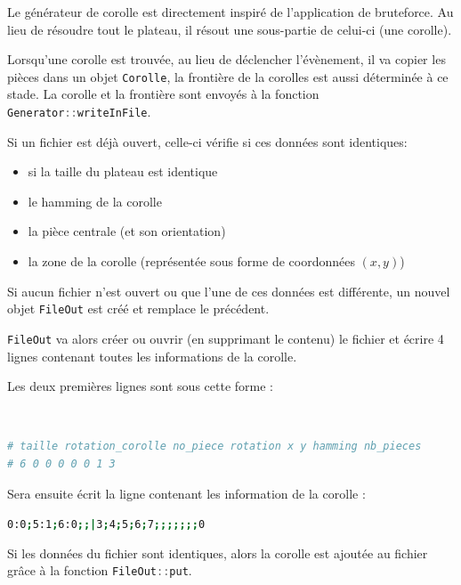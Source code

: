 Le générateur de corolle est directement inspiré de l'application de bruteforce. Au lieu de résoudre tout le plateau, il résout une sous-partie de celui-ci (une corolle).

Lorsqu'une corolle est trouvée, au lieu de déclencher l'évènement, il va copier les pièces dans un objet \lstinline[language=c++]|Corolle|, la frontière de la corolles est aussi déterminée à ce stade. La corolle et la frontière sont envoyés à la fonction \lstinline[language=c++]|Generator::writeInFile|.

Si un fichier est déjà ouvert, celle-ci vérifie si ces données sont identiques:

\begin{itemize}
	\item si la taille du plateau est identique
	\item le hamming de la corolle
	\item la pièce centrale (et son orientation) 
	\item la zone de la corolle (représentée sous forme de coordonnées $(x,y)$)
\end{itemize}
	
	Si aucun fichier n'est ouvert ou que l'une de ces données est différente, un nouvel objet \lstinline[language=c++]|FileOut| est créé et remplace le précédent.
	
	\lstinline[language=c++]|FileOut| va alors créer ou ouvrir (en supprimant le contenu) le fichier et écrire 4 lignes contenant toutes les informations de la corolle. 
	
	Les deux premières lignes sont sous cette forme :
	
	\begin{exmp}\ 
		
		\begin{lstlisting}[language=bash]
# taille rotation_corolle no_piece rotation x y hamming nb_pieces
# 6 0 0 0 0 0 1 3
	\end{lstlisting}
	\end{exmp}
	
	Sera ensuite écrit la ligne contenant les information de la corolle :
	
	\begin{exmp}
		\lstinline[language=bash]{0:0;5:1;6:0;;|3;4;5;6;7;;;;;;;0}
	\end{exmp}
	
	Si les données du fichier sont identiques, alors la corolle est ajoutée au fichier grâce à la fonction \lstinline[language=c++]{FileOut::put}.
	
